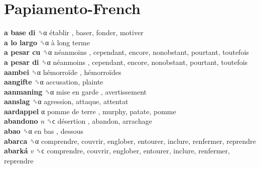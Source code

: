 \twocolumn
\chapter{Papiamento-French}
\small
{}\textbf{a base di} ␝α   établir , baser, fonder, motiver  \\
\textbf{a lo largo} ␝α   à long terme   \\
\textbf{a pesar cu} ␝α   néanmoins , cependant, encore, nonobstant, pourtant, toutefois  \\
\textbf{a pesar di} ␝α   néanmoins , cependant, encore, nonobstant, pourtant, toutefois  \\
\textbf{aambei} ␝α   hémorroïde ,  hémorroïdes   \\
\textbf{aangifte} ␝α  accusation, plainte  \\
\textbf{aanmaning} ␝α   mise en garde , avertissement  \\
\textbf{aanslag} ␝α  agression, attaque, attentat  \\
\textbf{aardappel} α   pomme de terre , murphy, patate, pomme  \\
\textbf{abandono} \emph{n}  ␝ϲ   désertion , abandon, arrachage  \\
\textbf{abao} ␝α   en bas , dessous  \\
\textbf{abarca} ␝α  comprendre, couvrir, englober, entourer, inclure, renfermer, reprendre  \\
\textbf{abarká} \emph{v}  ␝ϲ  comprendre, couvrir, englober, entourer, inclure, renfermer, reprendre  \\
